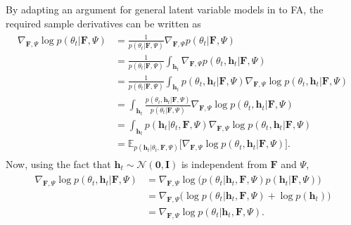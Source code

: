 \documentclass[msc,deptreport.inf]{infthesis} %
\newcommand{\matr}[1]{\mathbf{#1}}
\newcommand{\E}{\mathbb E}
\begin{document}
By adapting an argument for general latent variable models in \cite{barber2007} to FA, the required sample derivatives can be written as
\begin{align}\label{eqn:grad_log_likelihood}
\begin{split}
	\nabla_{\matr{F}, \Psi} \log p(\theta_t | \matr{F}, \Psi) 
	& = \frac{1}{p(\theta_t | \matr{F}, \Psi)} \nabla_{\matr{F}, \Psi} p(\theta_t | \matr{F}, \Psi) \\
	& = \frac{1}{p(\theta_t | \matr{F}, \Psi)} \int_{\matr{h}_t} \nabla_{\matr{F}, \Psi} p(\theta_t, \matr{h}_t | \matr{F}, \Psi) \\
	& = \frac{1}{p(\theta_t | \matr{F}, \Psi)} \int_{\matr{h}_t} p(\theta_t, \matr{h}_t | \matr{F}, \Psi) \nabla_{\matr{F}, \Psi} \log p(\theta_t, \matr{h}_t | \matr{F}, \Psi) \\
	& = \int_{\matr{h}_t} \frac{p(\theta_t, \matr{h}_t | \matr{F}, \Psi)}{p(\theta_t | \matr{F}, \Psi)} \nabla_{\matr{F}, \Psi} \log p(\theta_t, \matr{h}_t | \matr{F}, \Psi) \\
	& = \int_{\matr{h}_t} p(\matr{h}_t | \theta_t, \matr{F}, \Psi) \nabla_{\matr{F}, \Psi} \log p(\theta_t, \matr{h}_t | \matr{F}, \Psi) \\
	& = \E_{p(\matr{h}_t | \theta_t, \matr{F}, \Psi)} \big[ \nabla_{\matr{F}, \Psi} \log p(\theta_t, \matr{h}_t | \matr{F}, \Psi) \big].
\end{split}
\end{align}
Now, using the fact that $\matr{h}_t \sim \mathcal{N}(\matr{0}, \matr{I})$ is independent from $\matr{F}$ and $\Psi$,
\begin{align}\label{eqn:grad_log_complete_likelihood}
\begin{split}
	\nabla_{\matr{F}, \Psi} \log p(\theta_t, \matr{h}_t | \matr{F}, \Psi)
	& = \nabla_{\matr{F}, \Psi} \log \big(p(\theta_t | \matr{h}_t, \matr{F}, \Psi)p(\matr{h}_t | \matr{F}, \Psi)\big) \\
	& = \nabla_{\matr{F}, \Psi} \big( \log p(\theta_t | \matr{h}_t, \matr{F}, \Psi) + \log p(\matr{h}_t)\big) \\
	& = \nabla_{\matr{F}, \Psi} \log p(\theta_t | \matr{h}_t, \matr{F}, \Psi).
\end{split}
\end{align}
\end{document}

